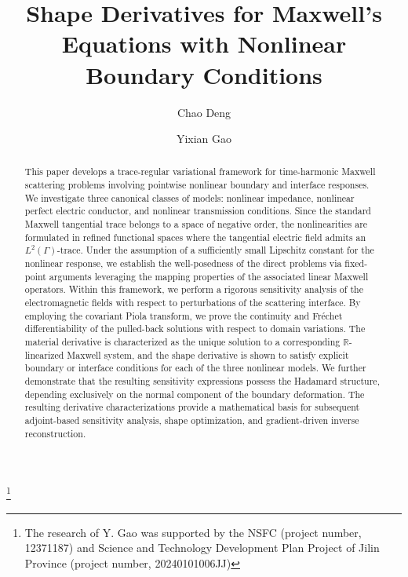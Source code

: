 \documentclass[12pt,reqno]{amsart}
\theoremstyle{definition}
\numberwithin{equation}{section}
\begin{document}
\title[Shape Derivatives for  Maxwell's Equations] {Shape Derivatives for  Maxwell's Equations with Nonlinear Boundary Conditions
}


\author{Chao Deng}
\address{School of
Mathematics and Statistics, Center for Mathematics and
Interdisciplinary Sciences, Northeast Normal University, Changchun, Jilin 130024, P.R.China. }
%


\author{Yixian Gao}
\address{School of
Mathematics and Statistics, Center for Mathematics and
Interdisciplinary Sciences, Northeast Normal University, Changchun, Jilin 130024, P.R.China. }




\thanks{The research of Y. Gao was supported by the NSFC
(project number, 12371187) and Science and Technology Development Plan Project of Jilin Province (project number, 20240101006JJ)}



\begin{abstract}
This paper develops a trace-regular variational framework for time-harmonic Maxwell scattering problems involving pointwise nonlinear boundary and interface responses. We investigate three canonical classes of models: nonlinear impedance, nonlinear perfect electric conductor, and nonlinear transmission conditions. Since the standard Maxwell tangential trace belongs to a space of negative order, the nonlinearities are formulated in refined functional spaces where the tangential electric field admits an $L^2(\Gamma)$-trace. Under the assumption of a sufficiently small Lipschitz constant for the nonlinear response, we establish the well-posedness of the direct problems via fixed-point arguments leveraging the mapping properties of the associated linear Maxwell operators.
Within this framework, we perform a rigorous sensitivity analysis of the electromagnetic fields with respect to perturbations of the scattering interface. By employing the covariant Piola transform, we prove the continuity and Fr\'echet differentiability of the pulled-back solutions with respect to domain variations. The material derivative is characterized as the unique solution to a corresponding $\mathbb{R}$-linearized Maxwell system, and the shape derivative is shown to satisfy explicit boundary or interface conditions for each of the three nonlinear models. We further demonstrate that the resulting sensitivity expressions possess the Hadamard structure, depending exclusively on the normal component of the boundary deformation. The resulting derivative characterizations provide a mathematical
basis for subsequent adjoint-based sensitivity analysis, shape optimization,
and gradient-driven inverse reconstruction.
\end{abstract}
\end{document}
